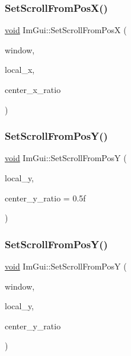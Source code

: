 \subsubsection{\texorpdfstring{Set\+Scroll\+From\+Pos\+X()}{SetScrollFromPosX()}\hspace{0.1cm}{\footnotesize\ttfamily [2/2]}}
{\footnotesize\ttfamily \hyperlink{imgui__impl__opengl3__loader_8h_ac668e7cffd9e2e9cfee428b9b2f34fa7}{void} Im\+Gui\+::\+Set\+Scroll\+From\+PosX (\begin{DoxyParamCaption}\item[{\hyperlink{structImGuiWindow}{Im\+Gui\+Window} $\ast$}]{window,  }\item[{float}]{local\+\_\+x,  }\item[{float}]{center\+\_\+x\+\_\+ratio }\end{DoxyParamCaption})}

\mbox{\label{namespaceImGui_a670d32573369e7ece9330d73f47e4d8b}} 
\subsubsection{\texorpdfstring{Set\+Scroll\+From\+Pos\+Y()}{SetScrollFromPosY()}\hspace{0.1cm}{\footnotesize\ttfamily [1/2]}}
{\footnotesize\ttfamily \hyperlink{imgui__impl__opengl3__loader_8h_ac668e7cffd9e2e9cfee428b9b2f34fa7}{void} Im\+Gui\+::\+Set\+Scroll\+From\+PosY (\begin{DoxyParamCaption}\item[{float}]{local\+\_\+y,  }\item[{float}]{center\+\_\+y\+\_\+ratio = {\ttfamily 0.5f} }\end{DoxyParamCaption})}

\mbox{\label{namespaceImGui_abf8364b7d1fe7c512e140ba16ba87c5c}} 
\subsubsection{\texorpdfstring{Set\+Scroll\+From\+Pos\+Y()}{SetScrollFromPosY()}\hspace{0.1cm}{\footnotesize\ttfamily [2/2]}}
{\footnotesize\ttfamily \hyperlink{imgui__impl__opengl3__loader_8h_ac668e7cffd9e2e9cfee428b9b2f34fa7}{void} Im\+Gui\+::\+Set\+Scroll\+From\+PosY (\begin{DoxyParamCaption}\item[{\hyperlink{structImGuiWindow}{Im\+Gui\+Window} $\ast$}]{window,  }\item[{float}]{local\+\_\+y,  }\item[{float}]{center\+\_\+y\+\_\+ratio }\end{DoxyParamCaption})}

